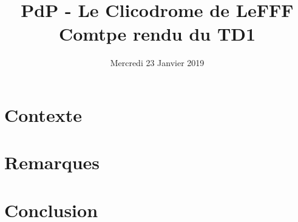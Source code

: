 \documentclass{article}
\title{PdP - Le Clicodrome de LeFFF \\ Comtpe rendu du TD1}
\author{}
\date{Mercredi 23 Janvier 2019}
\begin{document}
\maketitle

\section{Contexte}
\section{Remarques}
\section{Conclusion}
\end{document}
